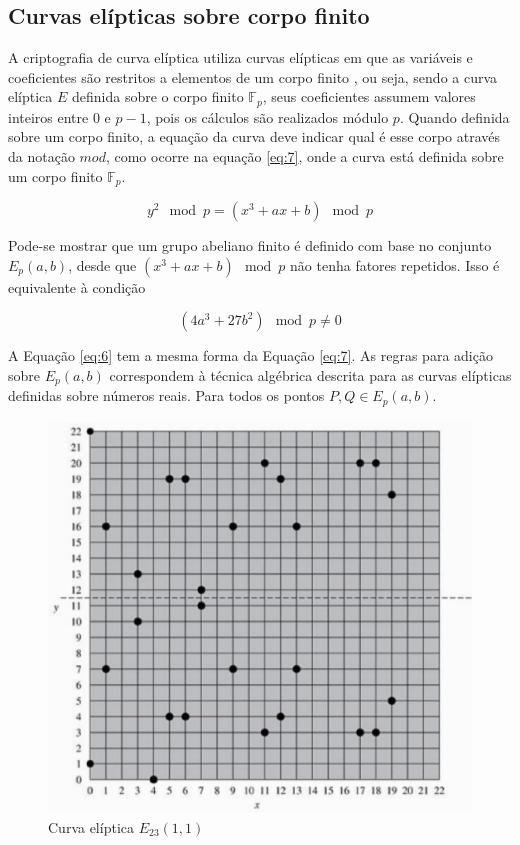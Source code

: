 %
%
\subsection{Curvas elípticas sobre corpo finito}
A criptografia de curva elíptica utiliza curvas elípticas em que as variáveis e coeficientes são restritos a elementos de um corpo finito \cite{Stallings:2011}, ou seja, sendo a curva elíptica $E$ definida sobre o corpo finito $\mathbb{F}_p$, seus coeficientes assumem valores inteiros entre 0 e $p - 1$, pois os cálculos são realizados módulo \(p\). Quando definida sobre um corpo finito, a equação da curva deve indicar qual é esse corpo através da notação $mod$, como ocorre na equação \ref{eq:7}, onde a curva está definida sobre um corpo finito $\mathbb{F}_p$.

\begin{equation}
y^2 \mod p = (x^3 + ax + b) \mod p \label{eq:7}
\end{equation}

Pode-se mostrar que um grupo abeliano finito é definido com base no conjunto $E_p(a, b)$, desde que $(x^3 + ax + b) \mod p$ não tenha fatores repetidos. Isso é equivalente à condição

\begin{equation}
(4a^3 + 27b^2) \mod p \neq 0
\end{equation}

A Equação \ref{eq:6} tem a mesma forma da Equação \ref{eq:7}. As regras para adição sobre $E_p(a, b)$ correspondem à técnica algébrica descrita para as curvas elípticas definidas sobre números reais. Para todos os pontos $P, Q \in E_p(a, b)$.

\begin{figure}[h]
\centering
\includegraphics[scale=0.6, bb=0 0 515 478]{figuras/curva_sobre_corpo_finito.eps}
\caption{Curva elíptica $E_{23}(1, 1)$}
\label{fig:curva_exemplo}
\end{figure}

